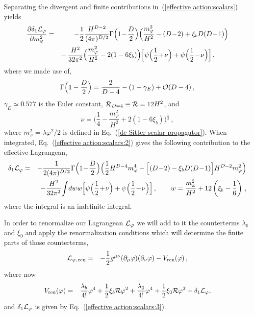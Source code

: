 \documentclass[aps,12pt,superscriptaddress,preprintnumbers,
                secnumarabic,nofootinbib,showpacs]{revtex4}
\begin{document}
Separating the divergent and finite contributions
in~(\ref{effective action:scalars}) yields
\begin{eqnarray}
  \frac{\partial \delta_1{\cal L}_\varphi}{\partial m_\varphi^2}
   &=& -\frac12\frac{H^{D-2}}{(4\pi)^{D/2}}\Gamma\Big(1\!-\!\frac{D}{2}\Big)
           \Big(\frac{m_\varphi^2}{H^2}
              - (D\!-\!2) + \xi_b D(D\!-\!1)
           \Big)
\nonumber\\
&&  -\,
\frac{H^2}{32\pi^2}\Big(\frac{m_\varphi^2}{H^2}-2(1-6\xi_b)\Big)
          \Big[\psi\Big(\frac{1}{2}\!+\!\nu\Big)
              +\psi\Big(\frac{1}{2}\!-\!\nu\Big)\Big]
\,,\qquad
\label{effective action:scalars:2}
\end{eqnarray}
where we made use of,
\begin{equation}
\Gamma\Big(1-\frac{D}{2}\Big) = \frac{2}{D-4} - (1-\gamma_E) + {\cal O}(D-4)
\,,
\label{Gamma 1-D/2}
\end{equation}
$\gamma_E \simeq 0.577$ is the Euler constant,
${\cal R}_{D=4}\equiv {\cal R} =12H^2$, and
\begin{equation}
\nu = \Big(\frac14 - \frac{m_\varphi^2}{H^2} +
2(1\!-\!6\xi_b)\Big)^{\frac12} \,,
\label{def:nu}
\end{equation}
where $m_\varphi ^2 = \lambda \varphi^2/2$ is defined in 
Eq.~(\ref{de Sitter scalar propagator}).
When integrated, Eq.~(\ref{effective action:scalars:2}) gives
the following contribution to the effective Lagrangean,
\begin{eqnarray}
\delta_1 {\cal L}_\varphi
    &=& -\frac{1}{2(4\pi)^{D/2}}\Gamma\Big(1\!-\!\frac{D}{2}\Big)
           \Big(\frac12H^{D-4}m_\varphi^4
          - \Big[(D\!-\!2)-\xi_b D(D\!-\!1)\Big]H^{D-2}m_\varphi^2\Big)
\label{effective action:scalars:3}
\\
&&\hskip 0.cm
     - \frac{H^{2}}{32\pi^2}
        \!\int\! dww
              \Big[\psi\Big(\frac{1}{2}\!+\!\nu\Big)
                              + \psi\Big(\frac{1}{2}\!-\!\nu\Big)\Big]\,,\qquad
w = \frac{m_\varphi^2}{H^2} +12\left(\xi_b-\frac16\right)\,,
\nonumber
\end{eqnarray}
where the integral is an indefinite integral.

In order to renormalize our Lagrangean ${\cal L}_\varphi $ we will
add to it the counterterms $\lambda_0$ and $\xi_0$ and apply
the renormalization conditions which will determine the finite parts
of those counterterms,
\begin{eqnarray}
{\cal L}_{\varphi,\,{\rm ren}} & = & - \frac12
g^{\mu\nu}(\partial_\mu\varphi)(\partial_\nu\varphi) -
V_{\mathrm{ren}}(\varphi)
\,,
\label{eff:lagrangean}
\end{eqnarray}
where now
\begin{eqnarray}
V_{\mathrm{ren}}(\varphi) & = & \frac{\lambda_b}{4!}\varphi^{4} +
\frac12 \xi_b \mathcal{R}\varphi^{2} +
\frac{\lambda_0}{4!}\varphi^{4} + \frac12 \xi_0
\mathcal{R}\varphi^{2} - \delta_1 {\cal L}_\varphi,
\label{Vren}
\end{eqnarray}
and $\delta_1 {\cal L}_\varphi$ is given by
Eq.~(\ref{effective action:scalars:3}).
\end{document}
